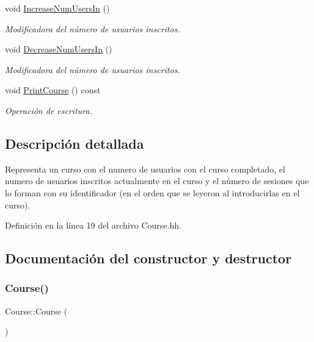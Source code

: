 \begin{DoxyCompactItemize}
void \mbox{\hyperlink{class_course_ab1bf31a23895b7ece77ab0c74a4de321}{Increase\+Num\+Users\+In}} ()
\begin{DoxyCompactList}\small\item\em Modificadora del número de usuarios inscritos. \end{DoxyCompactList}\item 
void \mbox{\hyperlink{class_course_ab23d9a5201da47a27d9b307a5889ca23}{Decrease\+Num\+Users\+In}} ()
\begin{DoxyCompactList}\small\item\em Modificadora del número de usuarios inscritos. \end{DoxyCompactList}\item 
void \mbox{\hyperlink{class_course_ae6becc4684a1ae379b9e26b4b50d8d23}{Print\+Course}} () const
\begin{DoxyCompactList}\small\item\em Operación de escritura. \end{DoxyCompactList}\end{DoxyCompactItemize}


\subsection{Descripción detallada}
Representa un curso con el numero de usuarios con el curso completado, el numero de usuarios inscritos actualmente en el curso y el número de sesiones que lo forman con su identificador (en el orden que se leyeron al introducirlas en el curso). 

Definición en la línea 19 del archivo Course.\+hh.



\subsection{Documentación del constructor y destructor}
\mbox{\label{class_course_a6b959ccf15d9ceed9e9c14a701561982}} 
\subsubsection{\texorpdfstring{Course()}{Course()}}
{\footnotesize\ttfamily Course\+::\+Course (\begin{DoxyParamCaption}{ }\end{DoxyParamCaption})}



